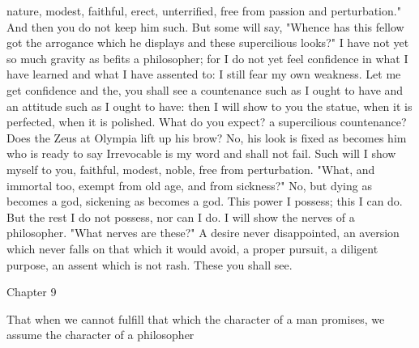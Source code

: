 \documentclass[a4paper]{article}
\begin{document}
nature, modest, faithful, erect, unterrified, free from passion and
perturbation." And then you do not keep him such.
    But some will say, "Whence has this fellow got the arrogance which he
displays and these supercilious looks?" I have not yet so much gravity as
befits a philosopher; for I do not yet feel confidence in what I have learned
and what I have assented to: I still fear my own weakness. Let me get
confidence and the, you shall see a countenance such as I ought to have and an
attitude such as I ought to have: then I will show to you the statue, when it
is perfected, when it is polished. What do you expect? a supercilious
countenance? Does the Zeus at Olympia lift up his brow? No, his look is fixed
as becomes him who is ready to say
       Irrevocable is my word and shall not fail.
Such will I show myself to you, faithful, modest, noble, free from
perturbation. "What, and immortal too, exempt from old age, and from sickness?"
No, but dying as becomes a god, sickening as becomes a god. This power I
possess; this I can do. But the rest I do not possess, nor can I do. I will
show the nerves of a philosopher. "What nerves are these?" A desire never
disappointed, an aversion which never falls on that which it would avoid, a
proper pursuit, a diligent purpose, an assent which is not rash. These you
shall see.

Chapter 9

That when we cannot fulfill that which the character of a man promises, we
                     assume the character of a philosopher
\end{document}
